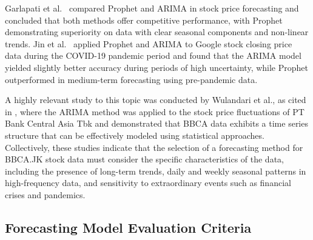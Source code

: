 \documentclass[11pt,twoside]{article}
\begin{document}
Garlapati et al.\ \cite{Garlapati2021} compared Prophet and ARIMA in stock price forecasting and concluded that both methods offer competitive performance, with Prophet demonstrating superiority on data with clear seasonal components and non-linear trends. Jin et al.\ \cite{Jin2022} applied Prophet and ARIMA to Google stock closing price data during the COVID-19 pandemic period and found that the ARIMA model yielded slightly better accuracy during periods of high uncertainty, while Prophet outperformed in medium-term forecasting using pre-pandemic data.

A highly relevant study to this topic was conducted by Wulandari et al., as cited in \cite{Kurnia2025}, where the ARIMA method was applied to the stock price fluctuations of PT Bank Central Asia Tbk and demonstrated that BBCA data exhibits a time series structure that can be effectively modeled using statistical approaches. Collectively, these studies indicate that the selection of a forecasting method for BBCA.JK stock data must consider the specific characteristics of the data, including the presence of long-term trends, daily and weekly seasonal patterns in high-frequency data, and sensitivity to extraordinary events such as financial crises and pandemics.

\subsection{Forecasting Model Evaluation Criteria}
\end{document}

